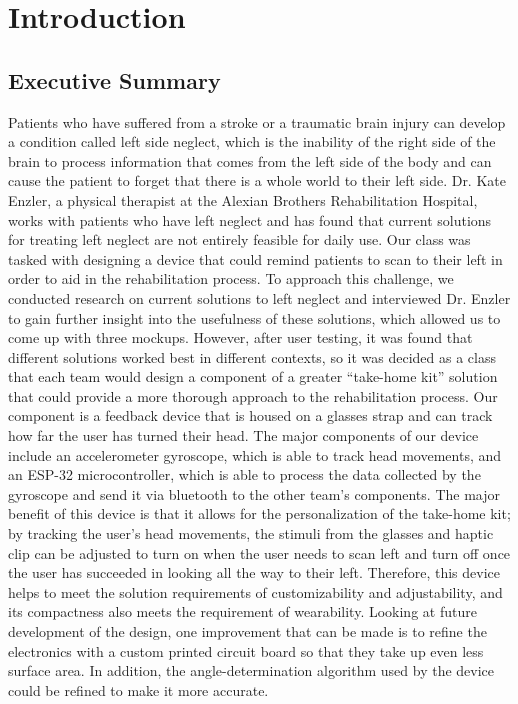 \chapter{Introduction}
\label{chap:intro}

\section{Executive Summary}

Patients who have suffered from a stroke or a traumatic brain injury can develop
a condition called left side neglect, which is the inability of the right side
of the brain to process information that comes from the left side of the body
and can cause the patient to forget that there is a whole world to their left
side. Dr. Kate Enzler, a physical therapist at the Alexian Brothers
Rehabilitation Hospital, works with patients who have left neglect and has found
that current solutions for treating left neglect are not entirely feasible for
daily use. Our class was tasked with designing a device that could remind
patients to scan to their left in order to aid in the rehabilitation process. To
approach this challenge, we conducted research on current solutions to left
neglect and interviewed Dr. Enzler to gain further insight into the usefulness
of these solutions, which allowed us to come up with three mockups. However,
after user testing, it was found that different solutions worked best in
different contexts, so it was decided as a class that each team would design a
component of a greater “take-home kit” solution that could provide a more
thorough approach to the rehabilitation process. Our component is a feedback
device that is housed on a glasses strap and can track how far the user has
turned their head. The major components of our device include an accelerometer
gyroscope, which is able to track head movements, and an ESP-32 microcontroller,
which is able to process the data collected by the gyroscope and send it via
bluetooth to the other team’s components. The major benefit of this device is
that it allows for the personalization of the take-home kit; by tracking the
user’s head movements, the stimuli from the glasses and haptic clip can be
adjusted to turn on when the user needs to scan left and turn off once the user
has succeeded in looking all the way to their left. Therefore, this device helps
to meet the solution requirements of customizability and adjustability, and its
compactness also meets the requirement of wearability. Looking at future
development of the design, one improvement that can be made is to refine the
electronics with a custom printed circuit board so that they take up even less
surface area. In addition, the angle-determination algorithm used by the device
could be refined to make it more accurate.

